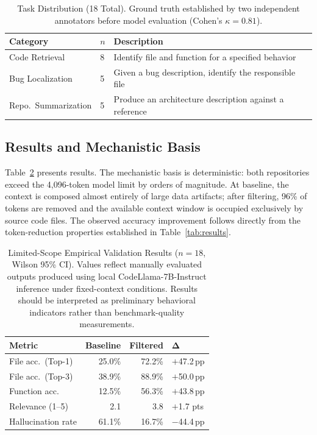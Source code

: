 \documentclass[conference]{IEEEtran}
\begin{document}
\begin{table}[t]
  \centering
  \caption{Task Distribution (18 Total). Ground truth established by
  two independent annotators before model evaluation
  (Cohen's $\kappa{=}0.81$).}
  \label{tab:tasks}
  \renewcommand{\arraystretch}{1.15}
  \begin{tabular}{@{}llp{3.5cm}@{}}
    \toprule
    \textbf{Category} & $n$ & \textbf{Description} \\
    \midrule
    Code Retrieval      & 8 & Identify file and function for a
                              specified behavior \\
    Bug Localization    & 5 & Given a bug description, identify
                              the responsible file \\
    Repo.\ Summarization& 5 & Produce an architecture description
                              against a reference \\
    \bottomrule
  \end{tabular}
\end{table}

\subsection{Results and Mechanistic Basis}

Table~\ref{tab:taskresults} presents results. The mechanistic basis is
deterministic: both repositories exceed the 4,096-token model limit by
orders of magnitude. At baseline, the context is composed almost
entirely of large data artifacts; after filtering, 96\% of tokens are
removed and the available context window is occupied exclusively by
source code files. The observed accuracy improvement follows directly
from the token-reduction properties established in
Table~\ref{tab:results}.

\begin{table}[t]
  \centering
  \caption{Limited-Scope Empirical Validation Results ($n{=}18$,
  Wilson 95\% CI). Values reflect manually evaluated outputs produced
  using local CodeLlama-7B-Instruct inference under fixed-context
  conditions. Results should be interpreted as preliminary behavioral
  indicators rather than benchmark-quality measurements.}
  \label{tab:taskresults}
  \renewcommand{\arraystretch}{1.15}
  \begin{tabular}{@{}lrrl@{}}
    \toprule
    \textbf{Metric} & \textbf{Baseline} & \textbf{Filtered} &
    $\boldsymbol{\Delta}$ \\
    \midrule
    File acc.\ (Top-1) & 25.0\% & 72.2\% & $+$47.2\,pp \\
    File acc.\ (Top-3) & 38.9\% & 88.9\% & $+$50.0\,pp \\
    Function acc.\     & 12.5\% & 56.3\% & $+$43.8\,pp \\
    Relevance (1--5)   & 2.1    & 3.8    & $+$1.7 pts  \\
    Hallucination rate & 61.1\% & 16.7\% & $-$44.4\,pp \\
    \bottomrule
  \end{tabular}
\end{table}
\end{document}
